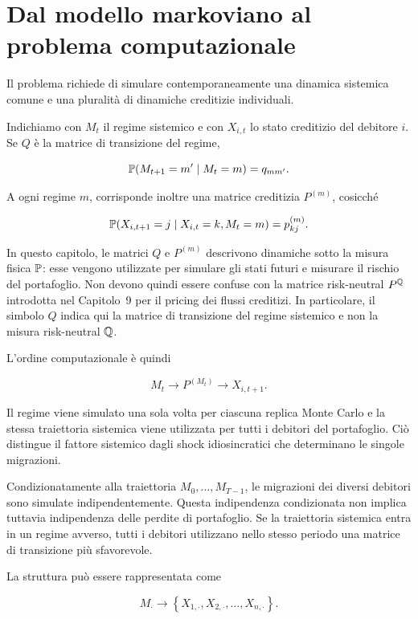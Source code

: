 
\section{Dal modello markoviano al problema computazionale}

Il problema richiede di simulare contemporaneamente una dinamica sistemica
comune e una pluralit\`a di dinamiche creditizie individuali.

Indichiamo con $M_t$ il regime sistemico e con $X_{i,t}$ lo stato creditizio
del debitore $i$. Se $Q$ \`e la matrice di transizione del regime,

\[
\mathbb{P}(M_{t+1}=m'\mid M_t=m)=q_{mm'}.
\]

A ogni regime $m$, corrisponde inoltre una matrice creditizia $P^{(m)}$,
cosicch\'e

\[
\mathbb{P}(X_{i,t+1}=j\mid X_{i,t}=k,M_t=m)=p_{kj}^{(m)}.
\]

In questo capitolo, le matrici $Q$ e $P^{(m)}$ descrivono dinamiche sotto la
misura fisica $\mathbb{P}$: esse vengono utilizzate per simulare gli stati futuri
e misurare il rischio del portafoglio. Non devono quindi essere confuse con
la matrice risk-neutral $P^{\mathbb{Q}}$ introdotta nel Capitolo~9 per il pricing dei
flussi creditizi. In particolare, il simbolo $Q$ indica qui la matrice di
transizione del regime sistemico e non la misura risk-neutral $\mathbb{Q}$.

L'ordine computazionale \`e quindi

\[
M_t
\longrightarrow
P^{(M_t)}
\longrightarrow
X_{i,t+1}.
\]

Il regime viene simulato una sola volta per ciascuna replica Monte Carlo e la
stessa traiettoria sistemica viene utilizzata per tutti i debitori del
portafoglio. Ci\`o distingue il fattore sistemico dagli shock idiosincratici
che determinano le singole migrazioni.

Condizionatamente alla traiettoria
$M_0,\ldots,M_{T-1}$, le migrazioni dei diversi debitori sono simulate
indipendentemente. Questa indipendenza condizionata non implica tuttavia
indipendenza delle perdite di portafoglio. Se la traiettoria sistemica entra
in un regime avverso, tutti i debitori utilizzano nello stesso periodo una
matrice di transizione pi\`u sfavorevole.

La struttura pu\`o essere rappresentata come

\[
M_{\cdot}
\longrightarrow
\left\{
X_{1,\cdot},
X_{2,\cdot},
\ldots,
X_{n,\cdot}
\right\}.
\]

